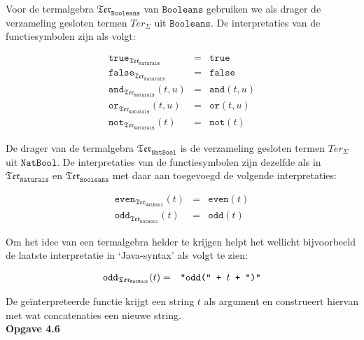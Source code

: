 \documentclass[a4paper,11pt]{article}
\begin{document}
Voor de termalgebra $\mathfrak{Ter}_{\texttt{Booleans}}$ van
$\texttt{Booleans}$ gebruiken we als drager de verzameling gesloten termen
$Ter_{\Sigma}$ uit $\texttt{Booleans}$. De interpretaties van de
functiesymbolen zijn als volgt:

\begin{eqnarray*}
  \texttt{true}_{\mathfrak{Ter}_{\texttt{Naturals}}}     & = & \texttt{true} \\
  \texttt{false}_{\mathfrak{Ter}_{\texttt{Naturals}}}    & = & \texttt{false} \\
  \texttt{and}_{\mathfrak{Ter}_{\texttt{Naturals}}}(t,u) & = & \texttt{and}(t,u) \\
  \texttt{or}_{\mathfrak{Ter}_{\texttt{Naturals}}}(t,u)  & = & \texttt{or}(t,u) \\
  \texttt{not}_{\mathfrak{Ter}_{\texttt{Naturals}}}(t)   & = & \texttt{not}(t)
\end{eqnarray*}

De drager van de termalgebra $\mathfrak{Ter}_{\texttt{NatBool}}$ is de
verzameling gesloten termen $Ter_{\Sigma}$ uit $\texttt{NatBool}$. De
interpretaties van de functiesymbolen zijn dezelfde als in
$\mathfrak{Ter}_{\texttt{Naturals}}$ en $\mathfrak{Ter}_{\texttt{Booleans}}$
met daar aan toegevoegd de volgende interpretaties:

\begin{eqnarray*}
  \texttt{even}_{\mathfrak{Ter}_{\texttt{NatBool}}}(t)   & = & \texttt{even}(t) \\
  \texttt{odd}_{\mathfrak{Ter}_{\texttt{NatBool}}}(t)   & = & \texttt{odd}(t)
\end{eqnarray*}

Om het idee van een termalgebra helder te krijgen helpt het wellicht
bijvoorbeeld de laatste interpretatie in `Java-syntax' als volgt te zien:

\begin{eqnarray*}
  \texttt{odd}_{\mathfrak{Ter}_{\texttt{NatBool}}}(t)   & = & \verb|"odd(" + | t \verb| + ")"|
\end{eqnarray*}

De ge\"interpreteerde functie krijgt een string $t$ als argument en
construeert hiervan met wat concatenaties een nieuwe string.\\[2em]


{\bf Opgave 4.6}
\end{document}
